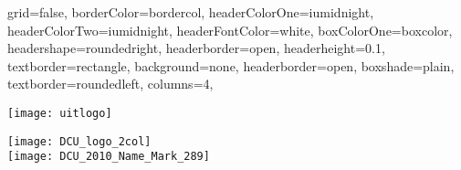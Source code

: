 \documentclass[fontscale=0.33,landscape,paperwidth=48in,paperheight=36in]{baposter}  %
\begin{document}
	\setlength{\pdfpageheight}{\paperheight}
	\setlength{\pdfpagewidth}{\paperwidth}


	\begin{poster}{
		grid=false,
		borderColor=bordercol,
		headerColorOne=iumidnight,
		headerColorTwo=iumidnight,
		headerFontColor=white,
		boxColorOne=boxcolor,
		headershape=roundedright,
		headerborder=open,
		headerheight=0.1\textheight,
		textborder=rectangle,
		background=none,
		headerborder=open,
		boxshade=plain,
		textborder=roundedleft,
		columns=4,
	}{ %
		\texttt{[image: uitlogo]}
		\hspace{2.5cm}\begin{minipage}[t]{7em}
			\vspace{-2cm}
			\noindent\texttt{[image: DCU\_logo\_2col]}\\
			\vspace{-0.5ex}\hspace{0.105cm}\texttt{[image: DCU\_2010\_Name\_Mark\_289]}
		\end{minipage}

}
\end{poster}
\end{document}
